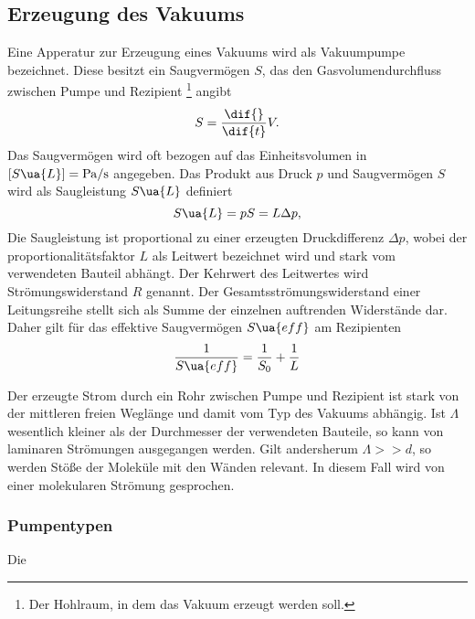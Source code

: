 \subsection{Erzeugung des Vakuums}
Eine Apperatur zur Erzeugung eines Vakuums wird als Vakuumpumpe bezeichnet. Diese besitzt ein
Saugvermögen $S$, das den Gasvolumendurchfluss zwischen Pumpe und Rezipient \footnote{Der Hohlraum, in dem das Vakuum erzeugt werden soll.}
angibt
\begin{equation}
  S = \frac{\dif{}}{\dif{t}} V.
\end{equation}
Das Saugvermögen wird oft bezogen auf das Einheitsvolumen in $[S\ua{L}] = \si{\pascal \per \second}$ angegeben.
Das Produkt aus Druck $p$ und Saugvermögen $S$ wird als Saugleistung $S\ua{L}$ definiert
\begin{equation}
  S\ua{L} = p S = L \Delta p ,
\end{equation}
Die Saugleistung ist proportional zu einer erzeugten Druckdifferenz $\Delta p$,
wobei der proportionalitätsfaktor $L$ als Leitwert bezeichnet wird und stark vom verwendeten Bauteil abhängt.
Der Kehrwert des Leitwertes wird Strömungswiderstand $R$ genannt. Der Gesamtsströmungswiderstand einer Leitungsreihe
stellt sich als Summe der einzelnen auftrenden Widerstände dar. Daher gilt für das effektive Saugvermögen $S\ua{eff}$ am Rezipienten
\begin{equation}
 \frac{1}{S\ua{eff}} = \frac{1}{S_0} + \frac{1}{L}
 \label{eq: effektives_saugvermögen}
\end{equation}

Der erzeugte Strom durch ein Rohr zwischen Pumpe und Rezipient ist stark von der mittleren freien Weglänge
und damit vom Typ des Vakuums abhängig. Ist $\Lambda$ wesentlich
kleiner als der Durchmesser der verwendeten Bauteile, so kann von laminaren Strömungen ausgegangen werden. Gilt andersherum
$\Lambda >> d$, so werden Stöße der Moleküle mit den Wänden relevant. In diesem Fall wird von einer molekularen Strömung gesprochen.


\subsubsection{Pumpentypen}
Die 


